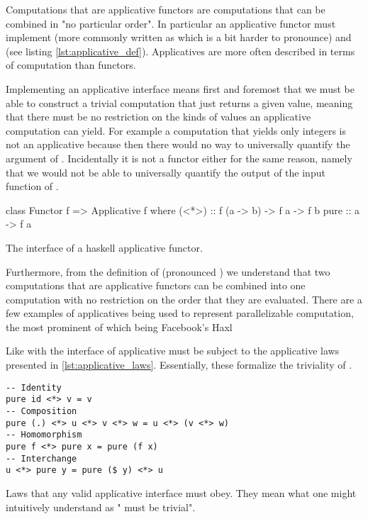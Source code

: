   Computations that are applicative functors
  \cite{mcbrideApplicativeProgrammingEffects2008} are
  computations that can be combined in "no particular order". In
  particular an applicative functor must implement  (more commonly written as \hask{<*>} which is a bit
  harder to pronounce) and  (see listing
  \ref{lst:applicative_def}). Applicatives are more often described in
  terms of computation than functors. 
  
  Implementing an applicative interface means first and foremost that we must
  be able to construct a trivial computation that just returns a given
  value, meaning that there must be no restriction on the kinds of
  values an applicative computation can yield. For example a computation
  that yields only integers is not an applicative because then there
  would no way to universally quantify the argument of
  . Incidentally it is not a functor either for the same
  reason, namely that we would not be able to universally quantify the
  output of the input function of .

  \begin{code}
\begin{haskellcode}
class Functor f => Applicative f  where
  (<*>) :: f (a -> b) -> f a -> f b
  pure :: a -> f a
\end{haskellcode}
    \caption{\label{lst:applicative_def}The interface of a haskell applicative functor.}
  \end{code}

  Furthermore, from the definition of \hask{<*>} (pronounced ) we
  understand that two computations that are applicative functors can be
  combined into one computation with no restriction on the order that
  they are evaluated. There are a few examples of applicatives being
  used to represent parallelizable computation, the most prominent of
  which being Facebook's Haxl \cite{marlowHaxlProjectFacebook2013}

  Like with  the interface of applicative must be subject
  to the applicative laws presented in
  \ref{lst:applicative_laws}. Essentially, these formalize the triviality
  of .

  \begin{code}
\begin{verbatim}
-- Identity
pure id <*> v = v
-- Composition
pure (.) <*> u <*> v <*> w = u <*> (v <*> w)
-- Homomorphism
pure f <*> pure x = pure (f x)
-- Interchange
u <*> pure y = pure ($ y) <*> u
\end{verbatim}
    \caption{\label{lst:applicative_laws}Laws that any valid applicative
      interface must obey. They mean what one might intuitively understand as
      " must be trivial".}
  \end{code}

